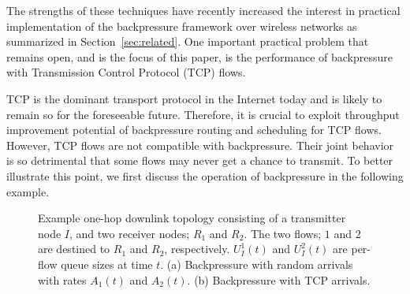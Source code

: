 \documentclass[conference]{IEEEtran}
\begin{document}
The strengths of these techniques have recently increased the interest in practical implementation of the backpressure framework over wireless networks as summarized in Section~\ref{sec:related}. One important practical problem that remains open, and is the focus of this paper, is the performance of backpressure with Transmission Control Protocol (TCP) flows.



TCP is the dominant transport protocol in the Internet today and is likely to remain so for the foreseeable future. Therefore, it is crucial to exploit throughput improvement potential of backpressure routing and scheduling for TCP flows. However, TCP flows are not compatible with backpressure.
Their joint behavior is so detrimental that some flows may never get a chance to transmit. To better illustrate this point, we first discuss the operation of backpressure in the following example.

\begin{figure}[t!]
\vspace{-10pt}
\centering
{}
\vspace{-5pt}
\caption{\scriptsize  Example one-hop downlink topology consisting of a transmitter node $I$, and two receiver nodes; $R_1$ and $R_2$. The two flows; $1$ and $2$ are destined to $R_1$ and $R_2$, respectively. $U_{I}^{1}(t)$ and $U_{I}^{2}(t)$ are per-flow queue sizes at time $t$. (a) Backpressure with random arrivals with rates $A_1(t)$ and $A_2(t)$. (b) Backpressure with TCP arrivals.  }
\vspace{-20pt}
\label{fig:intro_example}
\end{figure}
\end{document}
